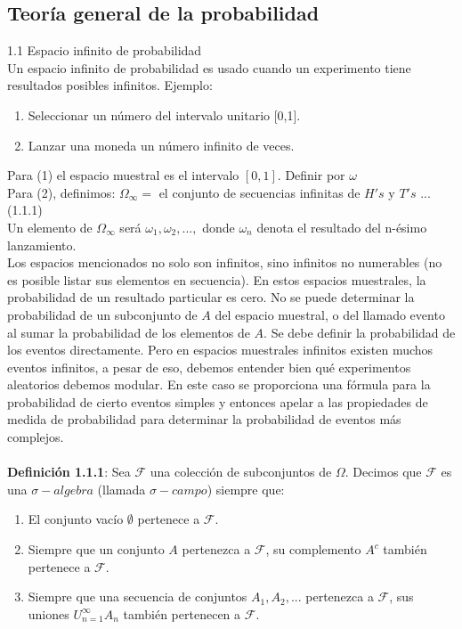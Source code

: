 \documentclass{article}
\begin{document}
        \subsection{Teoría general de la probabilidad}
        1.1 Espacio infinito de probabilidad
        \\
        Un espacio infinito de probabilidad es usado cuando un experimento tiene resultados posibles infinitos. Ejemplo:
        \begin{enumerate}
            \item Seleccionar un número del intervalo unitario [0,1].
            \item Lanzar una moneda un número infinito de veces.
        \end{enumerate}
        Para (1) el espacio muestral es el intervalo  $[0,1]$. Definir por $\omega$
        \\
        Para (2), definimos: $\Omega_\infty =$ el conjunto de secuencias infinitas de $H's$ y $T's$ ...(1.1.1)
        \\
        Un elemento de $\Omega_\infty$ será $\omega_1, \omega_2, ..., $ donde $\omega_n$ denota
        el resultado del n-ésimo lanzamiento.
        \\
        Los espacios mencionados no solo son infinitos, sino infinitos no numerables (no es posible listar sus elementos en secuencia).
        En estos espacios muestrales, la probabilidad de un resultado particular es cero. No se puede determinar la probabilidad de un subconjunto de $A$
        del espacio muestral, o del llamado evento al sumar la probabilidad de los elementos de $A$. Se debe definir la probabilidad de los eventos directamente.
        Pero en espacios muestrales infinitos existen muchos eventos infinitos, a pesar de eso, debemos entender bien qué experimentos aleatorios debemos modular.
        En este caso se proporciona una fórmula para la probabilidad de cierto eventos simples y entonces apelar a las propiedades de medida de probabilidad para
        determinar la probabilidad de eventos más complejos.
        \\
        \\
        \textbf{Definición 1.1.1}: Sea $\mathcal{F}$ una colección de subconjuntos de $\Omega$.
        Decimos que $\mathcal{F}$ es una $\sigma-algebra$ (llamada $\sigma-campo$) siempre que:
        \begin{enumerate}
            \item El conjunto vacío $\emptyset$ pertenece a $\mathcal{F}$.
            \item Siempre que un conjunto $A$ pertenezca a $\mathcal{F}$, su complemento $A^c$ también pertenece a $\mathcal{F}$.
            \item Siempre que una secuencia de conjuntos $A_1, A_2, ...$ pertenezca a $\mathcal{F}$, sus uniones $U_{n=1}^\infty A_n$ también pertenecen a $\mathcal{F}$.
        \end{enumerate}
\end{document}
